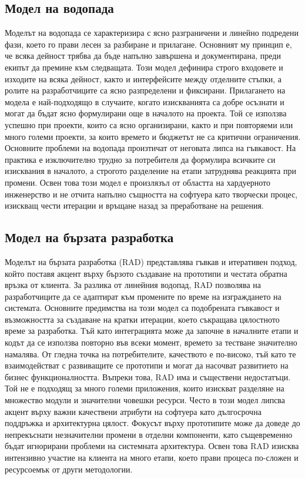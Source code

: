 \documentclass{article}
\renewcommand{\\}{\newline}
\begin{document}
\subsection{Модел на водопада}
Моделът на водопада се характеризира с ясно разграничени и линейно подредени фази, което го прави лесен за разбиране и прилагане. Основният му принцип е, че всяка дейност трябва да бъде напълно завършена и документирана, преди екипът да премине към следващата. Този модел дефинира строго входовете и изходите на всяка дейност, както и интерфейсите между отделните стъпки, а ролите на разработчиците са ясно разпределени и фиксирани. Прилагането на модела е най-подходящо в случаите, когато изискванията са добре осъзнати и могат да бъдат ясно формулирани още в началото на проекта. Той се използва успешно при проекти, които са ясно организирани, както и при повторяеми или много големи проекти, за които времето и бюджетът не са критични ограничения. Основните проблеми на водопада произтичат от неговата липса на гъвкавост. На практика е изключително трудно за потребителя да формулира всичките си изисквания в началото, а строгото разделение на етапи затруднява реакцията при промени. Освен това този модел е произлязъл от областта на хардуерното инженерство и не отчита напълно същността на софтуера като творчески процес, изискващ чести итерации и връщане назад за преработване на решения.

\subsection{Модел на бързата разработка}
Моделът на бързата разработка (RAD) представлява гъвкав и итеративен подход, който поставя акцент върху бързото създаване на прототипи и честата обратна връзка от клиента. За разлика от линейния водопад, RAD позволява на разработчиците да се адаптират към промените по време на изграждането на системата. Основните предимства на този модел са подобрената гъвкавост и възможността за създаване на кратки итерации, което съкращава цялостното време за разработка. Тъй като интеграцията може да започне в началните етапи и кодът да се използва повторно във всеки момент, времето за тестване значително намалява. От гледна точка на потребителите, качеството е по-високо, тъй като те взаимодействат с развиващите се прототипи и могат да насочват развитието на бизнес функционалността. Въпреки това, RAD има и съществени недостатъци. Той не е подходящ за много големи приложения, които изискват разделяне на множество модули и значителни човешки ресурси. Често в този модел липсва акцент върху важни качествени атрибути на софтуера като дългосрочна поддръжка и архитектурна цялост. Фокусът върху прототипите може да доведе до непрекъснати незначителни промени в отделни компоненти, като същевременно бъдат игнорирани проблеми на системната архитектура. Освен това RAD изисква интензивно участие на клиента на много етапи, което прави процеса по-сложен и ресурсоемък от други методологии.
\end{document}
